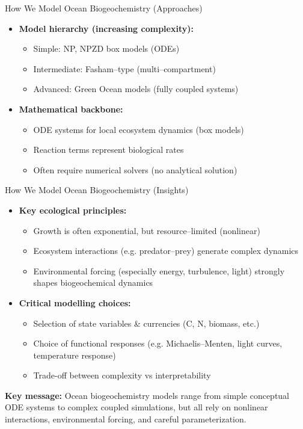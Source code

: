 \documentclass[english,aspectratio=169]{beamer}
\begin{document}
\begin{frame}{How We Model Ocean Biogeochemistry (Approaches)}
\begin{itemize}
    \item \textbf{Model hierarchy (increasing complexity):}
    \begin{itemize}
        \item Simple: NP, NPZD box models (ODEs)
        \item Intermediate: Fasham--type (multi--compartment)
        \item Advanced: Green Ocean models (fully coupled systems)
    \end{itemize}
    \item \textbf{Mathematical backbone:}
    \begin{itemize}
        \item ODE systems for local ecosystem dynamics (box models)
        \item Reaction terms represent biological rates
        \item Often require numerical solvers (no analytical solution)
    \end{itemize}
\end{itemize}

\end{frame}
\begin{frame}{How We Model Ocean Biogeochemistry (Insights)}
\begin{itemize}
    \item \textbf{Key ecological principles:}
    \begin{itemize}
        \item Growth is often exponential, but resource--limited (nonlinear)
        \item Ecosystem interactions (e.g. predator--prey) generate complex dynamics
        \item Environmental forcing (especially energy, turbulence, light) strongly shapes biogeochemical dynamics
    \end{itemize}
    \item \textbf{Critical modelling choices:}
    \begin{itemize}
        \item Selection of state variables \& currencies (C, N, biomass, etc.)
        \item Choice of functional responses (e.g. Michaelis--Menten, light curves, temperature response)
        \item Trade-off between complexity vs interpretability
    \end{itemize}
\end{itemize}
\textbf{Key message:} Ocean biogeochemistry models range from simple conceptual ODE systems to complex coupled simulations, but all rely on nonlinear interactions, environmental forcing, and careful parameterization.
\end{frame}
\end{document}
